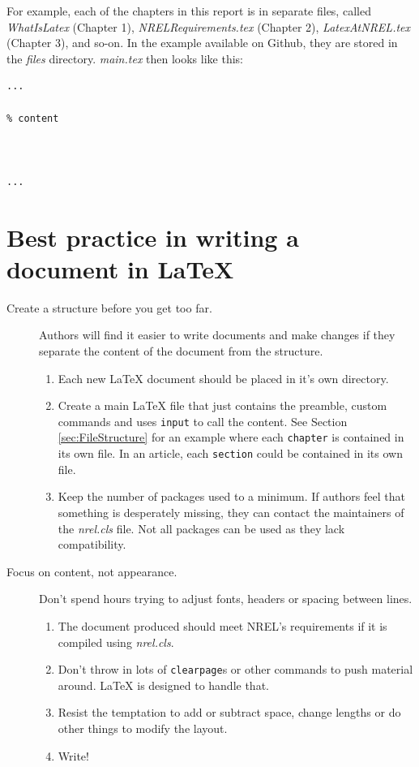 For example, each of the chapters in this report is in separate files, called \emph{WhatIsLatex} (Chapter 1), \emph{NRELRequirements.tex} (Chapter 2), \emph{LatexAtNREL.tex} (Chapter 3), and so-on. In the example available on Github, they are stored in the \emph{files} directory. \emph{main.tex} then looks like this:

\begin{lstlisting}
...

% content



...
\end{lstlisting}

\section{Best practice in writing a document in LaTeX}
\begin{description}
\item[Create a structure before you get too far.] Authors will find it easier to write documents and make changes if they separate the content of the document from the structure.
\begin{enumerate}
\item Each new LaTeX document should be placed in it's own directory. 
\item Create a main LaTeX file that just contains the preamble, custom commands and uses \texttt{input} to call the content. See Section \ref{sec:FileStructure} for an example where each \texttt{chapter} is contained in its own file. In an article, each \texttt{section} could be contained in its own file.
\item Keep the number of packages used to a minimum. If authors feel that something is desperately missing, they can contact the maintainers of the \emph{nrel.cls} file. Not all packages can be used as they lack compatibility.
\end{enumerate}
\item[Focus on content, not appearance.] Don't spend hours trying to adjust fonts, headers or spacing between lines. 
\begin{enumerate}
\item The document produced should meet NREL's requirements if it is compiled using \emph{nrel.cls}. 
\item Don't throw in lots of \texttt{clearpage}s or other commands to push material around. LaTeX is designed to handle that. 
\item Resist the temptation to add or subtract space, change lengths or do other things to modify the layout. 
\item Write!
\end{enumerate}
\end{description}
